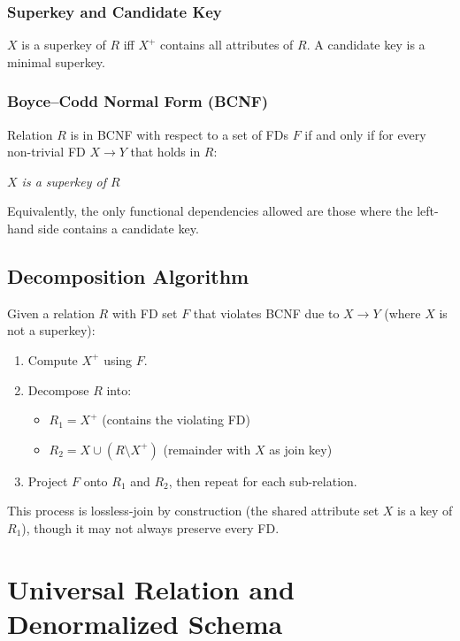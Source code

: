 \documentclass[12pt, a4paper]{article}
\begin{document}
\subsubsection{Superkey and Candidate Key}
$X$ is a superkey of $R$ iff $X^+$ contains all attributes of $R$.  A candidate key is
a minimal superkey.

\subsubsection{Boyce--Codd Normal Form (BCNF)}
Relation $R$ is in BCNF with respect to a set of FDs $F$ if and only if for every
non-trivial FD $X \to Y$ that holds in $R$:
\begin{center}
    \textit{$X$ is a superkey of $R$}
\end{center}
Equivalently, the only functional dependencies allowed are those where the left-hand
side contains a candidate key.

\subsection{Decomposition Algorithm}

Given a relation $R$ with FD set $F$ that violates BCNF due to $X \to Y$ (where $X$ is
not a superkey):

\begin{enumerate}[noitemsep]
    \item Compute $X^+$ using $F$.
    \item Decompose $R$ into:
    \begin{itemize}[noitemsep]
        \item $R_1 = X^+$ \quad (contains the violating FD)
        \item $R_2 = X \cup (R \setminus X^+)$ \quad (remainder with $X$ as join key)
    \end{itemize}
    \item Project $F$ onto $R_1$ and $R_2$, then repeat for each sub-relation.
\end{enumerate}

This process is lossless-join by construction (the shared attribute set $X$ is a key of
$R_1$), though it may not always preserve every FD.

\newpage
\section{Universal Relation and Denormalized Schema}
\end{document}
